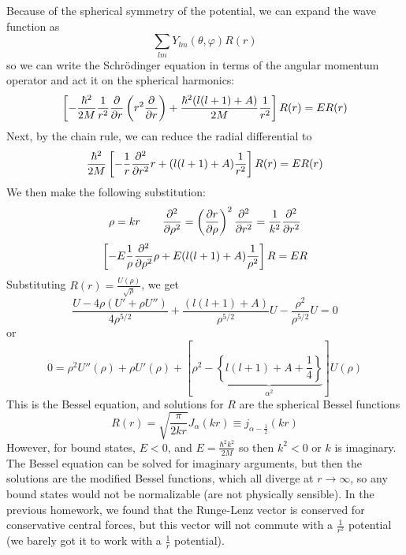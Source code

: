 \documentclass[a4paper,twoside]{article}
\begin{document}
\begin{problem}
    Because of the spherical symmetry of the potential, we can expand the wave function as
    \begin{equation}
        \sum_{lm} Y_{lm}(\theta, \varphi) R(r)
    \end{equation}
    so we can write the Schr\"odinger equation in terms of the angular momentum operator and act it on the spherical harmonics:
    \begin{equation}
        \left[- \frac{\hbar^2}{2M} \frac{1}{r^2} \pdv{r} \left( r^2 \pdv{r} \right) + \frac{\hbar^2 (l(l+1) + A)}{2M} \frac{1}{r^2}\right] R(r) = ER(r)
    \end{equation}
    Next, by the chain rule, we can reduce the radial differential to
    \begin{equation}
        \frac{\hbar^2}{2M} \left[ - \frac{1}{r} \pdv[2]{r} r + (l(l+1) + A) \frac{1}{r^2}\right] R(r) = ER(r)
    \end{equation}
    We then make the following substitution:
    \begin{equation}
        \rho = kr \qquad \pdv[2]{\rho} = \left(\pdv{r}{\rho}\right)^2 \pdv[2]{r} = \frac{1}{k^2} \pdv[2]{r}
    \end{equation}
    \begin{equation}
        \left[ - E \frac{1}{\rho} \pdv[2]{\rho} \rho + E(l(l+1) + A) \frac{1}{\rho^2} \right] R = ER
    \end{equation}
    Substituting $ R(r) = \frac{U(\rho)}{\sqrt{\rho}} $, we get
    \begin{equation}
        \frac{U - 4 \rho (U' + \rho U'')}{4 \rho^{5/2}} + \frac{(l(l+1) + A)}{\rho^{5/2}} U - \frac{\rho^2}{\rho^{5/2}} U = 0
    \end{equation}
    or
    \begin{equation}
        0 = \rho^2 U''(\rho) + \rho U'(\rho) + \left[ \rho^2 - \underbrace{ \left\{ l(l+1) + A + \frac{1}{4} \right\}}_{\alpha^2} \right]U(\rho)
    \end{equation}
    This is the Bessel equation, and solutions for $ R $ are the spherical Bessel functions
    \begin{equation}
        R(r) = \sqrt{\frac{\pi}{2kr}} J_{\alpha}(kr) \equiv j_{\alpha - \frac{1}{2}}(kr)
    \end{equation}
    However, for bound states, $ E < 0 $, and $ E = \frac{\hbar^2 k^2}{2M} $ so then $ k^2 < 0 $ or $ k $ is imaginary. The Bessel equation can be solved for imaginary arguments, but then the solutions are the modified Bessel functions, which all diverge at $ r \to \infty $, so any bound states would not be normalizable (are not physically sensible). In the previous homework, we found that the Runge-Lenz vector is conserved for conservative central forces, but this vector will not commute with a $ \frac{1}{r^2} $ potential (we barely got it to work with a $ \frac{1}{r} $ potential).
\end{problem}
\end{document}
